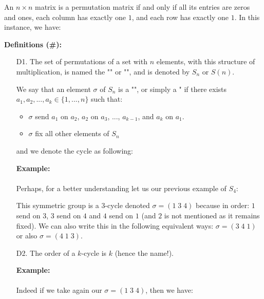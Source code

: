 	An $n\times n$ matrix is a permutation matrix if and only if all its entries are zeros and ones, each column has exactly one $1$, and each row has exactly one $1$.  In this instance, we have:
	 
	 \textbf{Definitions (\#\mydef):}
	 \begin{enumerate}
		\item[D1.] The set of permutations of a set with $n$ elements, with this structure of multiplication, is named the "" or "", and is denoted by $S_n$ or $S(n)$.
		
		We say that an element $\sigma$  of $S_n$ is a "", or simply a " if there exists $a_1,a_2,...,a_k\in \{1,...,n\}$ such that:
		\begin{itemize}
			\item $\sigma$ send $a_1$ on $a_2$, $a_2$ on $a_3$, ..., $a_{k-1}$, and $a_k$ on $a_1$.

			\item $\sigma$ fix all other elements of $S_n$
		\end{itemize}
		and we denote the cycle as following:
		
		\begin{tcolorbox}[colframe=black,colback=white,sharp corners]
		\textbf{{\Large {}}Example:}\\\\
		Perhaps, for a better understanding let us our previous example of $S_4$:
		
		This symmetric group is a $3$-cycle denoted $\sigma=(1\; 3\; 4)$ because in order: $1$ send on $3$, 3 send on $4$ and $4$ send on $1$ (and $2$ is not mentioned as it remains fixed). We can also write this in the following equivalent ways: $\sigma=(3\; 4\; 1)$ or also $\sigma=(4\; 1\; 3)$.
		\end{tcolorbox}

		\item[D2.] The order of a $k$-cycle is $k$ (hence the name!).
		\begin{tcolorbox}[colframe=black,colback=white,sharp corners]
		\textbf{{\Large {}}Example:}\\\\
		Indeed if we take again our $\sigma=(1\; 3\; 4)$, then we have:
		
		\end{tcolorbox}


\end{enumerate}
